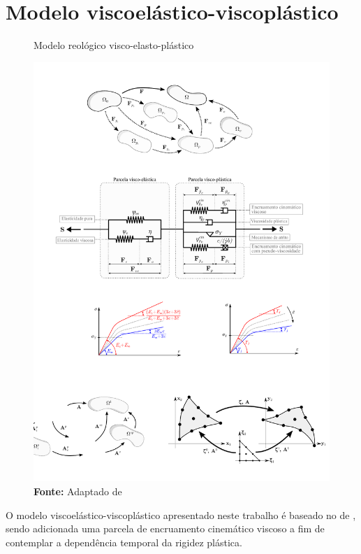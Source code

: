 \documentclass[Tese.tex]{subfiles}
\begin{document}
	
\chapter{Modelo viscoelástico-viscoplástico} \label{ch:vep}

\begin{figure}[!b]
	\centering
	\caption{Modelo reológico visco-elasto-plástico}
	\label{fig:modelo-reologico}
	\includegraphics[scale=0.9]{Figuras/modelo-reologico.pdf}
	\caption*{\textbf{Fonte:} Adaptado de }
\end{figure}

O modelo viscoelástico-viscoplástico apresentado neste trabalho é baseado no de , sendo adicionada uma parcela de encruamento cinemático viscoso a fim de contemplar a dependência temporal da rigidez plástica. 
\end{document}
